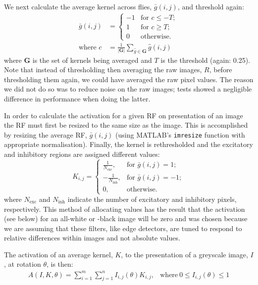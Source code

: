 \documentclass[10pt]{article}
\newcommand{\Matlab}{MATLAB}
\begin{document}
We next calculate the average kernel across flies, $\bar{g}(i,j)$, and threshold again:
\begin{align*}
\bar{g}(i,j) &= \left\{ \begin{array}{rl}
-1 & \mbox{for } c \le -T; \\
1 & \mbox{for } c \ge T; \\
0 & \mbox{otherwise.} 
\end{array} \right. \\
\mbox{where } c &= \frac{1}{|\mathbf{G}|}\sum\limits_{\hat{g} \in \mathbf{G}} \hat{g}(i,j)
\end{align*}
where $\mathbf{G}$ is the set of kernels being averaged and $T$ is the threshold (again: 0.25). Note that instead of thresholding then averaging the raw images, $R$, before thresholding them again, we could have averaged the raw pixel values. The reason we did not do so was to reduce noise on the raw images; tests showed a negligible difference in performance when doing the latter.

In order to calculate the activation for a given RF on presentation of an image the RF must first be resized to the same size as the image.
This is accomplished by resizing the average RF, $\bar{g}(i,j)$ (using \Matlab's \texttt{imresize} function with appropriate normalisation).
Finally, the kernel is rethresholded and the excitatory and inhibitory regions are assigned different values:
$$
K_{i,j} = \left\{
\begin{array}{rl}
\frac{1}{N_\mathrm{exc}}, & \mbox{for } \bar{g}(i,j) = 1; \\
-\frac{1}{N_\mathrm{inh}}, & \mbox{for } \bar{g}(i,j) = -1; \\
0, & \mbox{otherwise.}
\end{array}
\right.
$$
where $N_\mathrm{exc}$ and $N_\mathrm{inh}$ indicate the number of excitatory and inhibitory pixels, respectively.
This method of allocating values has the result that the activation (see below) for an all-white or -black image will be zero and was chosen because we are assuming that these filters, like edge detectors, are tuned to respond to relative differences within images and not absolute values.

The activation of an average kernel, $K$, to the presentation of a greyscale image, $I$, at rotation $\theta$, is then:
\begin{equation}
\label{eq:act}
\begin{array}{rl}
A(I,K,\theta) = {\sum\limits^m_{i=1} \sum\limits^n_{j=1} I_{i,j}(\theta)K_{i,j}}, &\mathrm{where\ } 0 \le I_{i,j}(\theta) \le 1
\end{array}
\end{equation}
\end{document}
